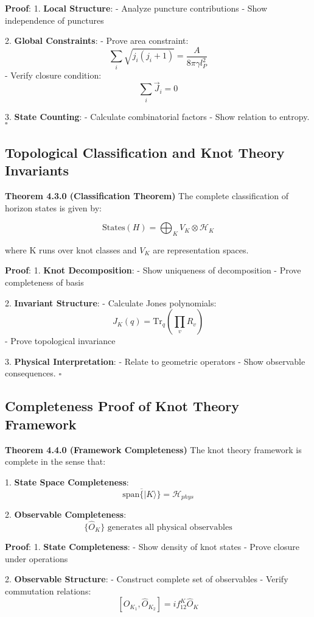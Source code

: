 \documentclass[12pt,a4paper]{article}
\begin{document}
\textbf{Proof}:
1. \textbf{Local Structure}:
   - Analyze puncture contributions
   - Show independence of punctures

2. \textbf{Global Constraints}:
   - Prove area constraint:
     \[
     \sum_i \sqrt{j_i(j_i+1)} = \frac{A}{8\pi\gamma l_P^2}
     \]
   - Verify closure condition:
     \[
     \sum_i \vec{J}_i = 0
     \]

3. \textbf{State Counting}:
   - Calculate combinatorial factors
   - Show relation to entropy. $\square$

\subsection{Topological Classification and Knot Theory Invariants}

\textbf{Theorem 4.3.0 (Classification Theorem)}
The complete classification of horizon states is given by:

\[
\text{States}(H) = \bigoplus_K V_K \otimes \mathcal{H}_K
\]

where K runs over knot classes and $V_K$ are representation spaces.

\textbf{Proof}:
1. \textbf{Knot Decomposition}:
   - Show uniqueness of decomposition
   - Prove completeness of basis

2. \textbf{Invariant Structure}:
   - Calculate Jones polynomials:
     \[
     J_K(q) = \text{Tr}_q(\prod_v R_v)
     \]
   - Prove topological invariance

3. \textbf{Physical Interpretation}:
   - Relate to geometric operators
   - Show observable consequences. $\square$

\subsection{Completeness Proof of Knot Theory Framework}

\textbf{Theorem 4.4.0 (Framework Completeness)}
The knot theory framework is complete in the sense that:

1. \textbf{State Space Completeness}:
   \[
   \overline{\text{span}\{|K\rangle\}} = \mathcal{H}_{phys}
   \]

2. \textbf{Observable Completeness}:
   \[
   \{\hat{O}_K\} \text{ generates all physical observables}
   \]

\textbf{Proof}:
1. \textbf{State Completeness}:
   - Show density of knot states
   - Prove closure under operations

2. \textbf{Observable Structure}:
   - Construct complete set of observables
   - Verify commutation relations:
     \[
     [\hat{O}_{K_1}, \hat{O}_{K_2}] = if_{12}^K\hat{O}_K
     \]
\end{document}
